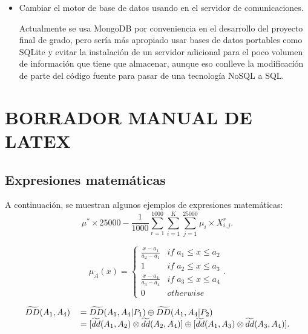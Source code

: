 \documentclass[spanish,12pt, a4paper, twoside]{paper}
\let\oldsection\section
\def\section{\cleardoublepage\oldsection}
\begin{document}
\begin{itemize}
\item Cambiar el motor de base de datos usando en el servidor de comunicaciones. 

Actualmente se usa MongoDB por conveniencia en el desarrollo del proyecto final de grado, pero sería más apropiado usar bases de datos portables como SQLite y evitar la instalación de un servidor adicional para el poco volumen de información que tiene que almacenar, aunque eso conlleve la modificación de parte del código fuente para pasar de una tecnología NoSQL a SQL.
\end{itemize}

\section{BORRADOR MANUAL DE LATEX}

\subsection{Expresiones matemáticas}
A continuación, se muestran algunos ejemplos de expresiones matemáticas:
\begin{equation}
\mu^*\times 25000-\frac{1}{1000}\sum_{r=1}^{1000}\sum_{i=1}^{K}\sum_{j=1}^{25000}\mu_i\times X_{i,j}^r.
\end{equation}

\begin{equation}
\mu_{\widetilde{A}}(x)=\left\{ \begin{array}{cc}
\frac{x-a_{1}}{a_{2}-a_{1}} & if\; a_{1}\leq x\leq a_{2}\\
1 & if\; a_{2}\leq x\leq a_{3}\\
\frac{x-a_{4}}{a_{3}-a_{4}} & if\; a_{3}\leq x\leq a_{4}\\
0 & otherwise
\end{array}\right. .
\end{equation}


\begin{equation}
\begin{tabular}{ll}
$\widetilde{DD}(A_{1},A_{4})$ & $=\widetilde{DD}(A_{1},A_{4}|P_{1})\oplus 
\widetilde{DD}(A_{1},A_{4}|P_{2})$ \\ 
& $=[\widetilde{dd}(A_{1},A_{2})\otimes \widetilde{dd}(A_{2},A_{4})]\oplus \lbrack \widetilde{dd}(A_{1},A_{3})\otimes \widetilde{%
dd}(A_{3},A_{4})].$%
\end{tabular}%
\end{equation}
\end{document}
